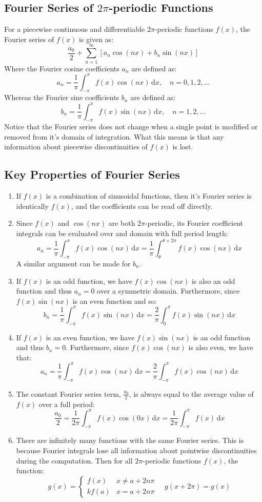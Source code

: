 \documentclass[12pt]{article}
\begin{document}
\subsection{Fourier Series of \(2\pi\)-periodic Functions}
For a piecewise continuous and differentiable \(2\pi\)-periodic functions \(f(x)\), the Fourier series of \(f(x)\) is given as:
\[\frac{a_0}{2}+\sum^\infty_{n=1}[a_n\cos(nx)+b_n\sin(nx)]\]
Where the Fourier cosine coefficients \(a_n\) are defined as:
\[a_n=\frac{1}{\pi}\int^\pi_{-\pi}f(x)\cos(nx)\,\text{d}x,\quad n=0,1,2,\dots\]
Whereas the Fourier sine coefficients \(b_n\) are defined as:
\[b_n=\frac{1}{\pi}\int^\pi_{-\pi}f(x)\sin(nx)\,\text{d}x,\quad n=1,2,\dots\]
Notice that the Fourier series does not change when a single point is modified or removed from it's domain of integration. What this means is that any information about piecewise discontinuities of \(f(x)\) is lost.
\subsection{Key Properties of Fourier Series}
\begin{enumerate}
    \item If \(f(x)\) is a combination of sinusoidal functions, then it's Fourier series is identically \(f(x)\), and the coefficients can be read off directly.
    \item Since \(f(x)\) and \(\cos(nx)\) are both \(2\pi\)-periodic, its Fourier coefficient integrals can be evaluated over and domain with full period length:
    \[a_n=\frac{1}{\pi}\int^\pi_{-\pi}f(x)\cos(nx)\,\text{d}x=\frac{1}{\pi}\int^{\theta+2\pi}_\theta f(x)\cos(nx)\,\text{d}x\]
    A similar argument can be made for \(b_n\).
    \item If \(f(x)\) is an odd function, we have \(f(x)\cos(nx)\) is also an odd function and thus \(a_n=0\) over a symmetric domain. Furthermore, since \(f(x)\sin(nx)\) is an even function and so:
    \[b_n=\frac{1}{\pi}\int^\pi_{-\pi}f(x)\sin(nx)\,\text{d}x=\frac{2}{\pi}\int^\pi_0f(x)\sin(nx)\,\text{d}x\]
    \item If \(f(x)\) is an even function, we have \(f(x)\sin(nx)\) is an odd function and thus \(b_n=0\). Furthermore, since \(f(x)\cos(nx)\) is also even, we have that:
    \[a_n=\frac{1}{\pi}\int^\pi_{-\pi}f(x)\cos(nx)\,\text{d}x=\frac{2}{\pi}\int^\pi_{-\pi}f(x)\cos(nx)\,\text{d}x\]
    \item The constant Fourier series term, \(\frac{a_0}{2}\), is always equal to the average value of \(f(x)\) over a full period:
    \[\frac{a_0}{2}=\frac{1}{2\pi}\int^\pi_{-\pi}f(x)\cos(0x)\,\text{d}x=\frac{1}{2\pi}\int^\pi_{-\pi}f(x)\,\text{d}x\]
    \item There are infinitely many functions with the same Fourier series. This is because Fourier integrals lose all information about pointwise discontinuities during the computation. Then for all \(2\pi\)-periodic functions \(f(x)\), the function:
    \[g(x)=\begin{cases}
        f(x) & x\ne a+2n\pi \\
        kf(a) & x=a+2n\pi
    \end{cases}\quad g(x+2\pi)=g(x)\]
\end{enumerate}
\end{document}
